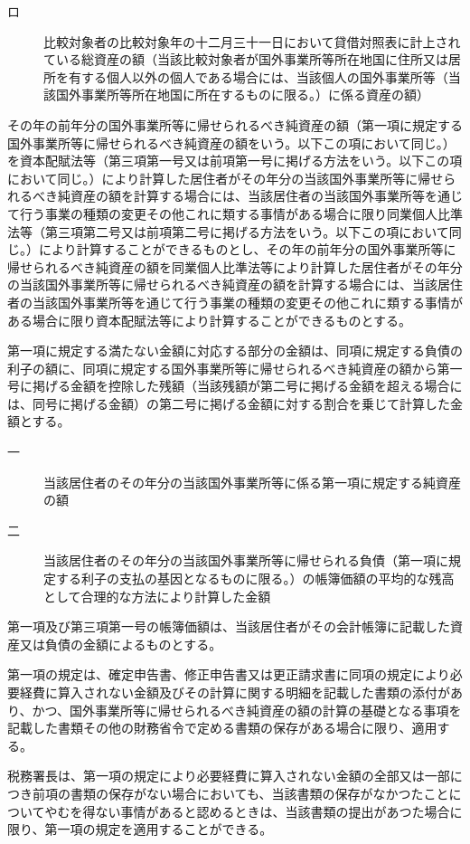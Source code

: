 \documentclass[twocolumn,a4j,10pt]{ltjtarticle}
\begin{document}
\begin{description}
\begin{description}
\begin{description}
\item[ロ]比較対象者の比較対象年の十二月三十一日において貸借対照表に計上されている総資産の額（当該比較対象者が国外事業所等所在地国に住所又は居所を有する個人以外の個人である場合には、当該個人の国外事業所等（当該国外事業所等所在地国に所在するものに限る。）に係る資産の額）
\end{description}
\end{description}
\item[\rensuji{7}]その年の前年分の国外事業所等に帰せられるべき純資産の額（第一項に規定する国外事業所等に帰せられるべき純資産の額をいう。以下この項において同じ。）を資本配賦法等（第三項第一号又は前項第一号に掲げる方法をいう。以下この項において同じ。）により計算した居住者がその年分の当該国外事業所等に帰せられるべき純資産の額を計算する場合には、当該居住者の当該国外事業所等を通じて行う事業の種類の変更その他これに類する事情がある場合に限り同業個人比準法等（第三項第二号又は前項第二号に掲げる方法をいう。以下この項において同じ。）により計算することができるものとし、その年の前年分の国外事業所等に帰せられるべき純資産の額を同業個人比準法等により計算した居住者がその年分の当該国外事業所等に帰せられるべき純資産の額を計算する場合には、当該居住者の当該国外事業所等を通じて行う事業の種類の変更その他これに類する事情がある場合に限り資本配賦法等により計算することができるものとする。
\item[\rensuji{8}]第一項に規定する満たない金額に対応する部分の金額は、同項に規定する負債の利子の額に、同項に規定する国外事業所等に帰せられるべき純資産の額から第一号に掲げる金額を控除した残額（当該残額が第二号に掲げる金額を超える場合には、同号に掲げる金額）の第二号に掲げる金額に対する割合を乗じて計算した金額とする。
\begin{description}
\item[一]当該居住者のその年分の当該国外事業所等に係る第一項に規定する純資産の額
\item[二]当該居住者のその年分の当該国外事業所等に帰せられる負債（第一項に規定する利子の支払の基因となるものに限る。）の帳簿価額の平均的な残高として合理的な方法により計算した金額
\end{description}
\item[\rensuji{9}]第一項及び第三項第一号の帳簿価額は、当該居住者がその会計帳簿に記載した資産又は負債の金額によるものとする。
\item[\rensuji{10}]第一項の規定は、確定申告書、修正申告書又は更正請求書に同項の規定により必要経費に算入されない金額及びその計算に関する明細を記載した書類の添付があり、かつ、国外事業所等に帰せられるべき純資産の額の計算の基礎となる事項を記載した書類その他の財務省令で定める書類の保存がある場合に限り、適用する。
\item[\rensuji{11}]税務署長は、第一項の規定により必要経費に算入されない金額の全部又は一部につき前項の書類の保存がない場合においても、当該書類の保存がなかつたことについてやむを得ない事情があると認めるときは、当該書類の提出があつた場合に限り、第一項の規定を適用することができる。
\end{description}
\end{document}
